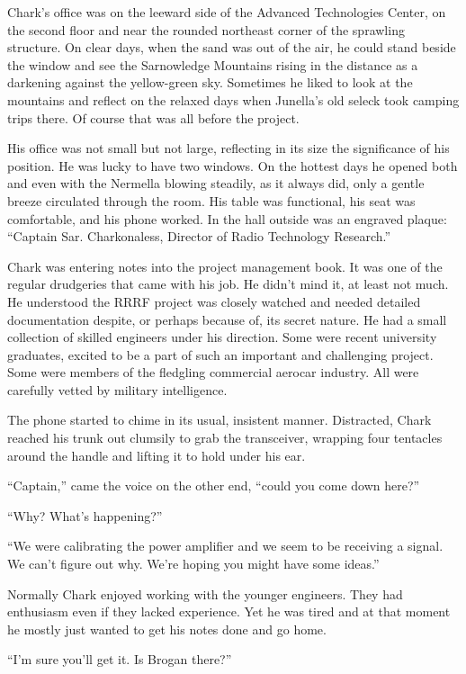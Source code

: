 
Chark's office was on the leeward side of the Advanced Technologies Center, on the second floor
and near the rounded northeast corner of the sprawling structure. On clear days, when the sand
was out of the air, he could stand beside the window and see the Sarnowledge Mountains rising in
the distance as a darkening against the yellow-green sky. Sometimes he liked to look at the
mountains and reflect on the relaxed days when Junella's old seleck took camping trips there. Of
course that was all before the project.

His office was not small but not large, reflecting in its size the significance of his position.
He was lucky to have two windows. On the hottest days he opened both and even with the Nermella
blowing steadily, as it always did, only a gentle breeze circulated through the room. His table
was functional, his seat was comfortable, and his phone worked. In the hall outside was an
engraved plaque: ``Captain Sar. Charkonaless, Director of Radio Technology Research.''

Chark was entering notes into the project management book. It was one of the regular drudgeries
that came with his job. He didn't mind it, at least not much. He understood the RRRF project was
closely watched and needed detailed documentation despite, or perhaps because of, its secret
nature. He had a small collection of skilled engineers under his direction. Some were recent
university graduates, excited to be a part of such an important and challenging project. Some
were members of the fledgling commercial aerocar industry. All were carefully vetted by military
intelligence.

The phone started to chime in its usual, insistent manner. Distracted, Chark reached his trunk
out clumsily to grab the transceiver, wrapping four tentacles around the handle and lifting it
to hold under his ear.

``Captain,'' came the voice on the other end, ``could you come down here?''

``Why? What's happening?''

``We were calibrating the power amplifier and we seem to be receiving a signal. We can't figure
out why. We're hoping you might have some ideas.''

Normally Chark enjoyed working with the younger engineers. They had enthusiasm even if they
lacked experience. Yet he was tired and at that moment he mostly just wanted to get his notes
done and go home.

``I'm sure you'll get it. Is Brogan there?''

